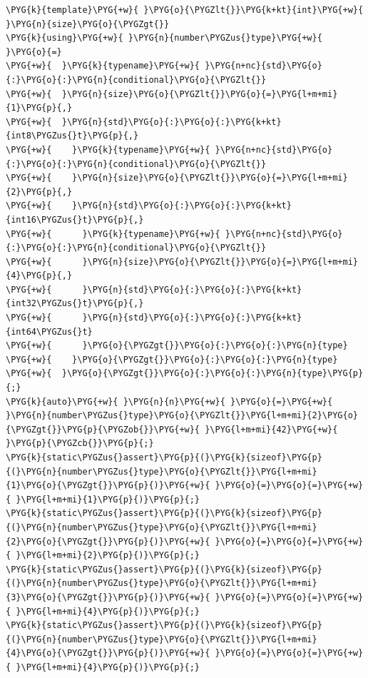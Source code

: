 \begin{itemize}
\begin{codeblockbg}
\begin{Verbatim}[commandchars=\\\{\},breaklines=true,breakanywhere=true,fontsize=\codefont,xleftmargin=17bp]
\PYG{k}{template}\PYG{+w}{ }\PYG{o}{\PYGZlt{}}\PYG{k+kt}{int}\PYG{+w}{ }\PYG{n}{size}\PYG{o}{\PYGZgt{}}
\PYG{k}{using}\PYG{+w}{ }\PYG{n}{number\PYGZus{}type}\PYG{+w}{ }\PYG{o}{=}
\PYG{+w}{  }\PYG{k}{typename}\PYG{+w}{ }\PYG{n+nc}{std}\PYG{o}{:}\PYG{o}{:}\PYG{n}{conditional}\PYG{o}{\PYGZlt{}}
\PYG{+w}{  }\PYG{n}{size}\PYG{o}{\PYGZlt{}}\PYG{o}{=}\PYG{l+m+mi}{1}\PYG{p}{,}
\PYG{+w}{  }\PYG{n}{std}\PYG{o}{:}\PYG{o}{:}\PYG{k+kt}{int8\PYGZus{}t}\PYG{p}{,}
\PYG{+w}{    }\PYG{k}{typename}\PYG{+w}{ }\PYG{n+nc}{std}\PYG{o}{:}\PYG{o}{:}\PYG{n}{conditional}\PYG{o}{\PYGZlt{}}
\PYG{+w}{    }\PYG{n}{size}\PYG{o}{\PYGZlt{}}\PYG{o}{=}\PYG{l+m+mi}{2}\PYG{p}{,}
\PYG{+w}{    }\PYG{n}{std}\PYG{o}{:}\PYG{o}{:}\PYG{k+kt}{int16\PYGZus{}t}\PYG{p}{,}
\PYG{+w}{      }\PYG{k}{typename}\PYG{+w}{ }\PYG{n+nc}{std}\PYG{o}{:}\PYG{o}{:}\PYG{n}{conditional}\PYG{o}{\PYGZlt{}}
\PYG{+w}{      }\PYG{n}{size}\PYG{o}{\PYGZlt{}}\PYG{o}{=}\PYG{l+m+mi}{4}\PYG{p}{,}
\PYG{+w}{      }\PYG{n}{std}\PYG{o}{:}\PYG{o}{:}\PYG{k+kt}{int32\PYGZus{}t}\PYG{p}{,}
\PYG{+w}{      }\PYG{n}{std}\PYG{o}{:}\PYG{o}{:}\PYG{k+kt}{int64\PYGZus{}t}
\PYG{+w}{      }\PYG{o}{\PYGZgt{}}\PYG{o}{:}\PYG{o}{:}\PYG{n}{type}
\PYG{+w}{    }\PYG{o}{\PYGZgt{}}\PYG{o}{:}\PYG{o}{:}\PYG{n}{type}
\PYG{+w}{  }\PYG{o}{\PYGZgt{}}\PYG{o}{:}\PYG{o}{:}\PYG{n}{type}\PYG{p}{;}
\PYG{k}{auto}\PYG{+w}{ }\PYG{n}{n}\PYG{+w}{ }\PYG{o}{=}\PYG{+w}{ }\PYG{n}{number\PYGZus{}type}\PYG{o}{\PYGZlt{}}\PYG{l+m+mi}{2}\PYG{o}{\PYGZgt{}}\PYG{p}{\PYGZob{}}\PYG{+w}{ }\PYG{l+m+mi}{42}\PYG{+w}{ }\PYG{p}{\PYGZcb{}}\PYG{p}{;}
\PYG{k}{static\PYGZus{}assert}\PYG{p}{(}\PYG{k}{sizeof}\PYG{p}{(}\PYG{n}{number\PYGZus{}type}\PYG{o}{\PYGZlt{}}\PYG{l+m+mi}{1}\PYG{o}{\PYGZgt{}}\PYG{p}{)}\PYG{+w}{ }\PYG{o}{=}\PYG{o}{=}\PYG{+w}{ }\PYG{l+m+mi}{1}\PYG{p}{)}\PYG{p}{;}
\PYG{k}{static\PYGZus{}assert}\PYG{p}{(}\PYG{k}{sizeof}\PYG{p}{(}\PYG{n}{number\PYGZus{}type}\PYG{o}{\PYGZlt{}}\PYG{l+m+mi}{2}\PYG{o}{\PYGZgt{}}\PYG{p}{)}\PYG{+w}{ }\PYG{o}{=}\PYG{o}{=}\PYG{+w}{ }\PYG{l+m+mi}{2}\PYG{p}{)}\PYG{p}{;}
\PYG{k}{static\PYGZus{}assert}\PYG{p}{(}\PYG{k}{sizeof}\PYG{p}{(}\PYG{n}{number\PYGZus{}type}\PYG{o}{\PYGZlt{}}\PYG{l+m+mi}{3}\PYG{o}{\PYGZgt{}}\PYG{p}{)}\PYG{+w}{ }\PYG{o}{=}\PYG{o}{=}\PYG{+w}{ }\PYG{l+m+mi}{4}\PYG{p}{)}\PYG{p}{;}
\PYG{k}{static\PYGZus{}assert}\PYG{p}{(}\PYG{k}{sizeof}\PYG{p}{(}\PYG{n}{number\PYGZus{}type}\PYG{o}{\PYGZlt{}}\PYG{l+m+mi}{4}\PYG{o}{\PYGZgt{}}\PYG{p}{)}\PYG{+w}{ }\PYG{o}{=}\PYG{o}{=}\PYG{+w}{ }\PYG{l+m+mi}{4}\PYG{p}{)}\PYG{p}{;}

\end{Verbatim}
\end{codeblockbg}
\end{itemize}

